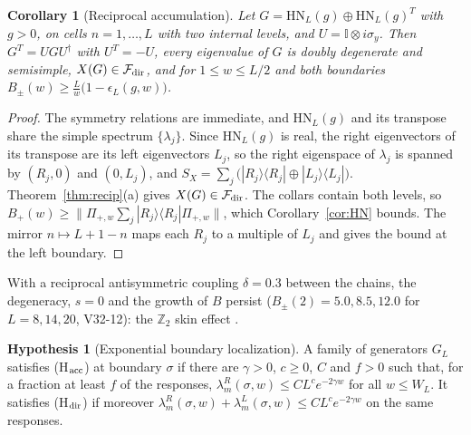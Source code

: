 \documentclass[11pt]{article}
\newtheorem{corollary}[theorem]{Corollary}
\theoremstyle{definition}
\newtheorem{hypothesis}{Hypothesis}
\theoremstyle{remark}
\newcommand{\one}{\mathbb{I}}
\newcommand{\proj}[1]{|#1\rangle\!\langle #1|}
\newcommand{\Free}{\mathcal{F}}
\begin{document}
\begin{corollary}[Reciprocal accumulation]\label{cor:z2}
Let $G=\mathrm{HN}_L(g)\oplus\mathrm{HN}_L(g)^T$ with $g>0$, on cells $n=1,\dots,L$ with two internal levels, and $U=\one\otimes i\sigma_y$. Then $G^T=UGU^\dagger$ with $U^T=-U$, every eigenvalue of $G$ is doubly degenerate and semisimple, $X(G)\in\Free_{\rm dir}$, and for $1\le w\le L/2$ and both boundaries $B_\pm(w)\ge\frac Lw\bigl(1-\epsilon_L(g,w)\bigr)$.
\end{corollary}
\begin{proof}
The symmetry relations are immediate, and $\mathrm{HN}_L(g)$ and its transpose share the simple spectrum $\{\lambda_j\}$. Since $\mathrm{HN}_L(g)$ is real, the right eigenvectors of its transpose are its left eigenvectors $L_j$, so the right eigenspace of $\lambda_j$ is spanned by $(R_j,0)$ and $(0,L_j)$, and $S_X=\sum_j\bigl(\proj{R_j}\oplus\proj{L_j}\bigr)$. Theorem~\ref{thm:recip}(a) gives $X(G)\in\Free_{\rm dir}$. The collars contain both levels, so $B_+(w)\ge\bigl\|\Pi_{+,w}\sum_j\proj{R_j}\Pi_{+,w}\bigr\|$, which Corollary~\ref{cor:HN} bounds. The mirror $n\mapsto L+1-n$ maps each $R_j$ to a multiple of $L_j$ and gives the bound at the left boundary.
\end{proof}

With a reciprocal antisymmetric coupling $\delta=0.3$ between the chains, the degeneracy, $s=0$ and the growth of $B$ persist ($B_\pm(2)=5.0,8.5,12.0$ for $L=8,14,20$, V32-12): the $\mathbb Z_2$ skin effect \cite{OKSS20}.

\begin{hypothesis}[Exponential boundary localization]\label{hyp:H}
A family of generators $G_L$ satisfies (H$_{\rm acc}$) at boundary $\sigma$ if there are $\gamma>0$, $c\ge0$, $C$ and $f>0$ such that, for a fraction at least $f$ of the responses, $\lambda^R_m(\sigma,w)\le CL^ce^{-2\gamma w}$ for all $w\le W_L$. It satisfies (H$_{\rm dir}$) if moreover $\lambda^R_m(\sigma,w)+\lambda^L_m(\sigma,w)\le CL^ce^{-2\gamma w}$ on the same responses.
\end{hypothesis}
\end{document}
